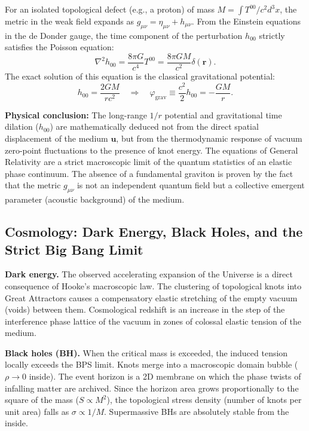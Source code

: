 \documentclass[11pt,a4paper]{article}
\begin{document}
For an isolated topological defect (e.g., a proton) of mass $M = \int T^{00}/c^2 d^3x$, the metric in the weak field expands as $g_{\mu\nu} = \eta_{\mu\nu} + h_{\mu\nu}$. From the Einstein equations in the de Donder gauge, the time component of the perturbation $h_{00}$ strictly satisfies the Poisson equation:
\begin{equation}
\nabla^2 h_{00} = \frac{8\pi G}{c^4} T^{00} = \frac{8\pi G M}{c^2} \delta(\mathbf{r}).
\end{equation}
The exact solution of this equation is the classical gravitational potential:
\begin{equation}
h_{00} = \frac{2 G M}{r c^2} \quad \Longrightarrow \quad \varphi_{\text{grav}} \equiv \frac{c^2}{2} h_{00} = - \frac{GM}{r}.
\end{equation}

\textbf{Physical conclusion:} The long-range $1/r$ potential and gravitational time dilation ($h_{00}$) are mathematically deduced not from the direct spatial displacement of the medium $\mathbf{u}$, but from the thermodynamic response of vacuum zero-point fluctuations to the presence of knot energy. The equations of General Relativity are a strict macroscopic limit of the quantum statistics of an elastic phase continuum. The absence of a fundamental graviton is proven by the fact that the metric $g_{\mu\nu}$ is not an independent quantum field but a collective emergent parameter (acoustic background) of the medium.

\subsection{Cosmology: Dark Energy, Black Holes, and the Strict Big Bang Limit}
\textbf{Dark energy.} The observed accelerating expansion of the Universe is a direct consequence of Hooke's macroscopic law. The clustering of topological knots into Great Attractors causes a compensatory elastic stretching of the empty vacuum (voids) between them. Cosmological redshift is an increase in the step of the interference phase lattice of the vacuum in zones of colossal elastic tension of the medium.

\textbf{Black holes (BH).} When the critical mass is exceeded, the induced tension locally exceeds the BPS limit. Knots merge into a macroscopic domain bubble ($\rho \to 0$ inside). The event horizon is a 2D membrane on which the phase twists of infalling matter are archived. Since the horizon area grows proportionally to the square of the mass ($S \propto M^2$), the topological stress density (number of knots per unit area) falls as $\sigma \propto 1/M$. Supermassive BHs are absolutely stable from the inside.
\end{document}
